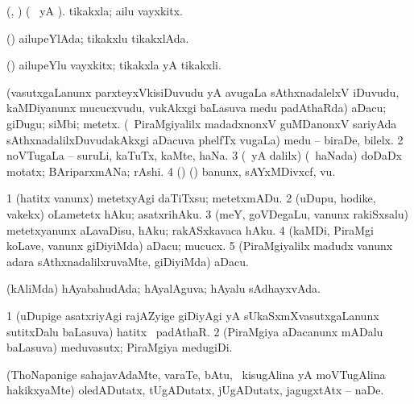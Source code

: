 \bentry
{} 
\gl{\nA}
\expl{}
\bmng
(\ame, \ashi) (\bava\  yA ). tikakxla; ailu vayxkitx. 
\emng
\eentry

\bentry
{} 
\gl{\gu}
\bmng
(\ashi) ailupeYlAda; tikakxlu tikakxlAda. 
\emng
\eentry

\bentry
{} 
\gl{\nA}
\bmng
(\ashi) ailupeYlu vayxkitx; tikakxla yA tikakxli. 
\emng
\eentry

\bentry
{} 
\gl{\nA}
\expl{}
\bmng
\bnum
{} 
\banum
{} (vasutxgaLanunx parxteyxVkisiDuvudu yA avugaLa sAthxnadalelxV iDuvudu, kaMDiyanunx mucucxvudu, \mo vukAkxgi baLasuva medu padAthaRda) aDacu; giDugu; siMbi; metetx. 
 (\kanmu\ PiraMgiyalilx madadxnonxV guMDanonxV sariyAda sAthxnadalilxDuvudakAkxgi aDacuva phelfTx \mo vugaLa) medu -- biraDe, bilelx. 
\eanum
\numie
\num{2} noVTugaLa -- suruLi, kaTuTx, kaMte, haNa. 
\num{3} (\Eva\ yA \bava dalilx) (\kanmu\ haNada) doDaDx motatx; BAriparxmANa; rAshi. 
\num{4} (\birx) ({\ashi}) banunx, sAYxMDivxcf, \mo vu. 
\enum
\emng
\eentry

\bentry
{} 
\gl{\sakirx}
\bmng
\bnum
\num{1} (hatitx \mo vanunx) metetxyAgi daTiTxsu; metetxmADu. 
\num{2} (uDupu, hodike, \mo vakekx) oLametetx hAku; asatxrihAku. 
\num{3} (meY, goVDegaLu, \mo vanunx rakiSxsalu) metetxyanunx aLavaDisu, hAku; rakASxkavaca hAku. 
\num{4} (kaMDi, PiraMgi koLave, \mo vanunx giDiyiMda) aDacu; mucucx. 
\num{5} (PiraMgiyalilx madudx \mo vanunx adara sAthxnadalilxruvaMte, giDiyiMda) aDacu. 
\enum
\emng
\eentry

\bentry
{} 
\gl{\gu}
\expl{}
\bmng
(kAliMda) hAyabahudAda; hAyalAguva; hAyalu sAdhayxvAda. 
\emng
\eentry

\bentry
{} 
\gl{\nA}
\bmng
\bnum
\num{1} (uDupige asatxriyAgi rajAZyige giDiyAgi yA sUkaSxmXvasutxgaLanunx sutitxDalu baLasuva) hatitx \mo\ padAthaR. 
\num{2} (PiraMgiya aDacanunx mADalu baLasuva) meduvasutx; PiraMgiya medugiDi. 
\enum
\emng
\eentry

\bentry
{} 
\gl{\akirx}
\expl{}
\bmng
(ThoNapanige sahajavAdaMte, varaTe, bAtu, \mo\ kisugAlina yA moVTugAlina hakikxyaMte) oledADutatx, tUgADutatx, jUgADutatx, jagugxtAtx -- naDe. 
\emng
\eentry


